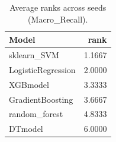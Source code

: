 \begin{table}[t]
\centering
\begin{tabular}{lr}
\toprule
Model & rank \\
\midrule
sklearn_SVM & 1.1667 \\
LogisticRegression & 2.0000 \\
XGBmodel & 3.3333 \\
GradientBoosting & 3.6667 \\
random_forest & 4.8333 \\
DTmodel & 6.0000 \\
\bottomrule
\end{tabular}
\caption{Average ranks across seeds (Macro_Recall).}
\label{tab:avg_rank_Macro_Recall}
\end{table}